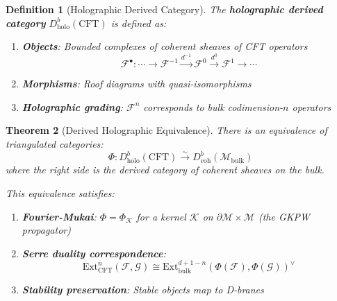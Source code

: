 \documentclass[12pt,a4paper]{article}
\newtheorem{theorem}{Theorem}[section]
\newtheorem{definition}[theorem]{Definition}
\begin{document}
\begin{definition}[Holographic Derived Category]\label{def:holo-derived}
The \textbf{holographic derived category} $D^b_{\text{holo}}(\text{CFT})$ is defined as:
\begin{enumerate}
    \item \textbf{Objects}: Bounded complexes of coherent sheaves of CFT operators
    \begin{equation}
    \mathcal{F}^\bullet: \cdots \to \mathcal{F}^{-1} \xrightarrow{d^{-1}} \mathcal{F}^0 \xrightarrow{d^0} \mathcal{F}^1 \to \cdots
    \end{equation}
    
    \item \textbf{Morphisms}: Roof diagrams with quasi-isomorphisms
    
    \item \textbf{Holographic grading}: $\mathcal{F}^n$ corresponds to bulk codimension-$n$ operators
\end{enumerate}
\end{definition}

\begin{theorem}[Derived Holographic Equivalence]\label{thm:derived-holo}
There is an equivalence of triangulated categories:
\begin{equation}
\Phi: D^b_{\text{holo}}(\text{CFT}) \xrightarrow{\sim} D^b_{\text{coh}}(\mathcal{M}_{\text{bulk}})
\end{equation}
where the right side is the derived category of coherent sheaves on the bulk.

This equivalence satisfies:
\begin{enumerate}
    \item \textbf{Fourier-Mukai}: $\Phi = \Phi_{\mathcal{K}}$ for a kernel $\mathcal{K}$ on $\partial\mathcal{M} \times \mathcal{M}$ (the GKPW propagator)
    
    \item \textbf{Serre duality correspondence}:
    \begin{equation}
    \text{Ext}^n_{\text{CFT}}(\mathcal{F}, \mathcal{G}) \cong \text{Ext}^{d+1-n}_{\text{bulk}}(\Phi(\mathcal{F}), \Phi(\mathcal{G}))^\vee
    \end{equation}
    
    \item \textbf{Stability preservation}: Stable objects map to D-branes
\end{enumerate}
\end{theorem}
\end{document}
